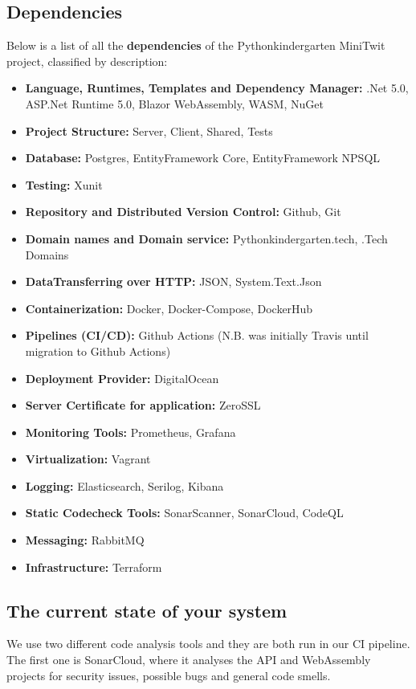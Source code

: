 \subsection{Dependencies}
Below is a list of all the \textbf{dependencies} of the Pythonkindergarten MiniTwit project, classified by description:
\begin{itemize}
    \item \textbf{Language, Runtimes, Templates and Dependency Manager:}
      .Net 5.0, ASP.Net Runtime 5.0, Blazor WebAssembly, WASM, NuGet
    \item \textbf{Project Structure:} Server, Client, Shared, Tests
    \item \textbf{Database:} Postgres, EntityFramework Core, EntityFramework NPSQL
    \item \textbf{Testing:} Xunit
    \item \textbf{Repository and Distributed Version Control:} Github, Git
    \item \textbf{Domain names and Domain service:} Pythonkindergarten.tech, .Tech Domains
    \item \textbf{DataTransferring over HTTP:} JSON, System.Text.Json
    \item \textbf{Containerization:} Docker, Docker-Compose, DockerHub
    \item \textbf{Pipelines (CI/CD):} Github Actions (N.B. was initially Travis until migration to Github Actions)
    \item \textbf{Deployment Provider:} DigitalOcean
    \item \textbf{Server Certificate for application:} ZeroSSL
    \item \textbf{Monitoring Tools:} Prometheus, Grafana
    \item \textbf{Virtualization:} Vagrant
    \item \textbf{Logging:} Elasticsearch, Serilog, Kibana
    \item \textbf{Static Codecheck Tools:} SonarScanner, SonarCloud, CodeQL
    \item \textbf{Messaging:} RabbitMQ
    \item \textbf{Infrastructure:} Terraform
\end{itemize}


\subsection{The current state of your system}
We use two different code analysis tools and they are both run in our CI pipeline. The first one is SonarCloud, where it analyses the API and WebAssembly projects for security issues, possible bugs and general code smells.

